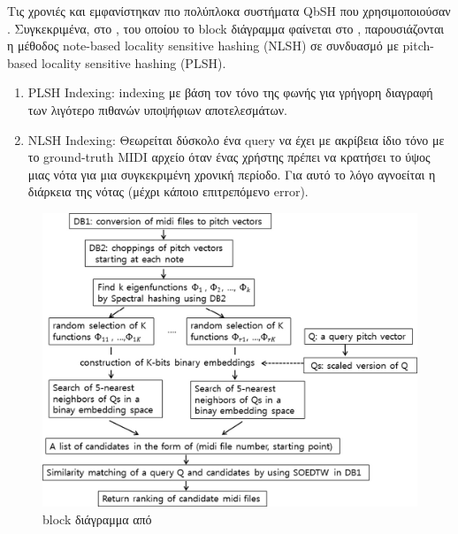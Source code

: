 Τις χρονιές \citeyear{wang2012query} και \citeyear{guo2013query} εμφανίστηκαν πιο πολύπλοκα συστήματα QbSH που χρησιμοποιούσαν \lsh{}.
Συγκεκριμένα, στο \cite{wang2012query}, του οποίου το block διάγραμμα φαίνεται στο ,
παρουσιάζονται η μέθοδος note-based locality sensitive hashing (NLSH)
σε συνδυασμό με pitch-based locality sensitive hashing (PLSH).
\begin{enumerate}
    \item PLSH Indexing:
    indexing με βάση τον τόνο της φωνής για γρήγορη διαγραφή των λιγότερο πιθανών υποψήφιων αποτελεσμάτων.
    \item NLSH Indexing:
    Θεωρείται δύσκολο ένα query να έχει με ακρίβεια ίδιο τόνο με το ground-truth MIDI αρχείο όταν ένας χρήστης πρέπει να κρατήσει το ύψος μιας νότα για μια συγκεκριμένη χρονική περίοδο.
    Για αυτό το λόγο αγνοείται η διάρκεια της νότας (μέχρι κάποιο επιτρεπόμενο error).
\end{enumerate}

\begin{figure}
        \centering
        \vspace{-20pt}\includegraphics[width=\linewidth]{park2015query}
        \vspace{-20pt}\caption{block διάγραμμα από \protect\cite{park2015query}}
        \label{fig:park2015query}
\end{figure}

